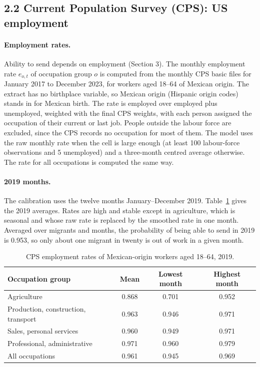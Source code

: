 \documentclass[11pt]{article}
\begin{document}
\subsection*{2.2 Current Population Survey (CPS): US employment}

\paragraph{Employment rates.} Ability to send depends on employment (Section 3). The monthly employment rate $e_{o,t}$ of occupation group $o$ is computed from the monthly CPS basic files for January 2017 to December 2023, for workers aged 18--64 of Mexican origin. The extract has no birthplace variable, so Mexican origin (Hispanic origin codes) stands in for Mexican birth. The rate is employed over employed plus unemployed, weighted with the final CPS weights, with each person assigned the occupation of their current or last job. People outside the labour force are excluded, since the CPS records no occupation for most of them. The model uses the raw monthly rate when the cell is large enough (at least 100 labour-force observations and 5 unemployed) and a three-month centred average otherwise. The rate for all occupations is computed the same way.

\paragraph{2019 months.} The calibration uses the twelve months January--December 2019. Table~\ref{tab:cps} gives the 2019 averages. Rates are high and stable except in agriculture, which is seasonal and whose raw rate is replaced by the smoothed rate in one month. Averaged over migrants and months, the probability of being able to send in 2019 is 0.953, so only about one migrant in twenty is out of work in a given month.

\begin{table}[ht]
\centering
\caption{CPS employment rates of Mexican-origin workers aged 18--64, 2019.}
\label{tab:cps}
\begin{tabular}{lccc}
\toprule
Occupation group & Mean & Lowest month & Highest month \\
\midrule
Agriculture & 0.868 & 0.701 & 0.952 \\
Production, construction, transport & 0.963 & 0.946 & 0.971 \\
Sales, personal services & 0.960 & 0.949 & 0.971 \\
Professional, administrative & 0.971 & 0.960 & 0.979 \\
All occupations & 0.961 & 0.945 & 0.969 \\
\bottomrule
\end{tabular}
\end{table}
\end{document}
